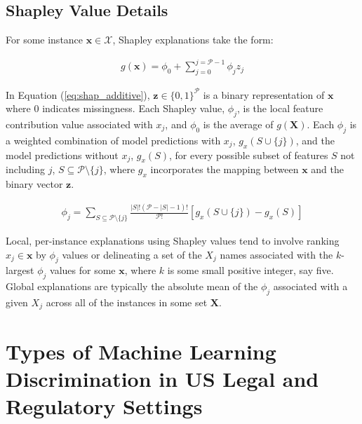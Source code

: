 \documentclass[information,article,accept,moreauthors,pdftex]{Definitions/mdpi}
\begin{document}
{\subsection{Shapley Value Details}\label{a_ssec:shap}

For some instance $\mathbf{x} \in \mathcal{X}$, Shapley explanations take the form: 

\begin{equation}
\label{eq:shap_additive}
\begin{aligned}
g(\mathbf{x}) = \phi_0 + \sum_{j=0}^{j=\mathcal{P} - 1} \phi_j z_j
\end{aligned}
\end{equation}

 In Equation (\ref{eq:shap_additive}), $\mathbf{z} \in \{0,1\}^\mathcal{P}$ is a binary representation of $\mathbf{x}$ where 0 indicates missingness. Each Shapley value, $\phi_j$, is the local feature contribution value associated with $x_j$, and $\phi_0$ is the average of $g(\mathbf{X})$. Each $\phi_j$ is a weighted combination of model predictions with $x_j$, $g_x(S \cup \{j\})$, and the model predictions without $x_j$, $g_x(S)$, for every possible subset of features $S$ not including $j$, $S \subseteq \mathcal{P} \setminus \{j\}$, where $g_x$ incorporates the mapping between $\mathbf{x}$ and the binary vector $\mathbf{z}$. 

\begin{equation}
\label{eq:shap_contrib}
\begin{aligned}
\phi_{j} = \sum_{S \subseteq \mathcal{P} \setminus \{j\}}\frac{|S|!(\mathcal{P} -|S| -1)!}{\mathcal{P}!}[g_x(S \cup \{j\}) - g_x(S)]
\end{aligned}
\end{equation}

 Local, per-instance explanations using Shapley values tend to involve ranking $x_j \in \mathbf{x}$ by $\phi_j$ values or delineating a set of the $X_j$ names associated with the $k$-largest $\phi_j$ values for some $\mathbf{x}$, where $k$ is some small positive integer, say five. Global explanations are typically the absolute mean of the $\phi_j$ associated with a given $X_j$ across all of the instances in some set $\mathbf{X}$.

\section{Types of Machine Learning Discrimination in US Legal and Regulatory Settings}\label{a_sec:types}

}
\end{document}
